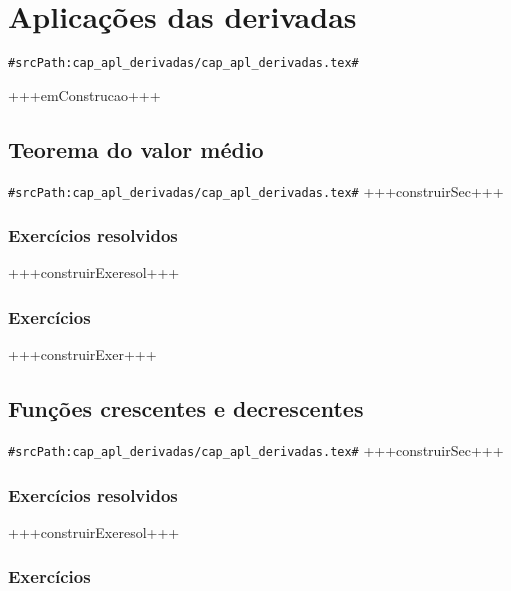 
\chapter{Aplicações das derivadas}
\verb+#srcPath:cap_apl_derivadas/cap_apl_derivadas.tex#+
\label{cap:apl_derivadas}

+++emConstrucao+++

\section{Teorema do valor médio}
\verb+#srcPath:cap_apl_derivadas/cap_apl_derivadas.tex#+
+++construirSec+++

\subsection*{Exercícios resolvidos}

+++construirExeresol+++


\subsection*{Exercícios}

+++construirExer+++


\section{Funções crescentes e decrescentes}
\verb+#srcPath:cap_apl_derivadas/cap_apl_derivadas.tex#+
+++construirSec+++

\subsection*{Exercícios resolvidos}

+++construirExeresol+++


\subsection*{Exercícios}

